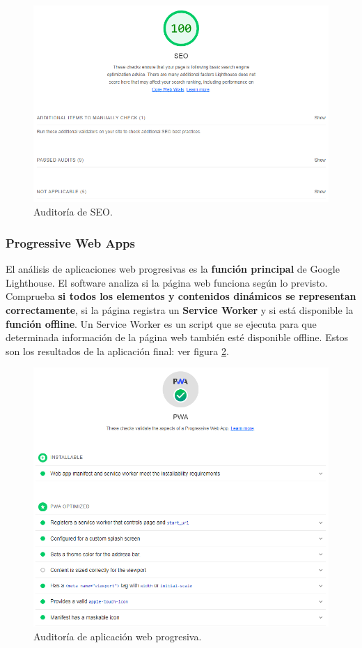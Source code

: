 \documentclass[12pt,twoside,titlepage]{report}
\begin{document}
{\begin{figure}[H]
    \centering
    \includegraphics[scale=0.6]{Lighthouse/SEO}
    \caption{Auditoría de SEO.}
    \label{fig:Lighthouse_seo}
\end{figure}

\subsubsection{Progressive Web Apps}

El análisis de aplicaciones web progresivas es la \textbf{función principal} de Google Lighthouse. El software analiza si la página web funciona según lo previsto. Comprueba \textbf{si todos los elementos y contenidos dinámicos se representan correctamente}, si la página registra un \textbf{Service Worker} y si está disponible la \textbf{función offline}. Un Service Worker es un script que se ejecuta para que determinada información de la página web también esté disponible offline. Estos son los resultados de la aplicación final:  ver figura \ref{fig:Lighthouse_PWA}.

\begin{figure}[H]
    \centering
    \includegraphics[scale=0.6]{Lighthouse/PWA}
    \caption{Auditoría de aplicación web progresiva.}
    \label{fig:Lighthouse_PWA}
\end{figure}

}
\end{document}
